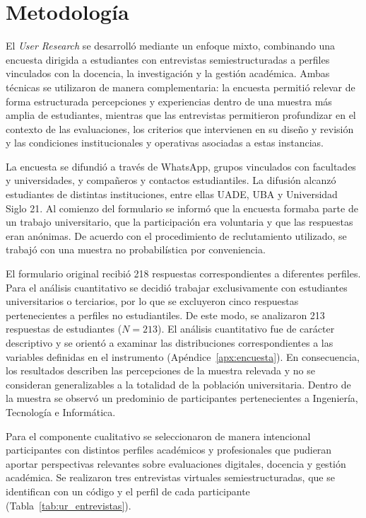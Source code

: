 \section{Metodología}

El \textit{User Research} se desarrolló mediante un enfoque mixto, combinando una encuesta dirigida a estudiantes con entrevistas semiestructuradas a perfiles vinculados con la docencia, la investigación y la gestión académica. Ambas técnicas se utilizaron de manera complementaria: la encuesta permitió relevar de forma estructurada percepciones y experiencias dentro de una muestra más amplia de estudiantes, mientras que las entrevistas permitieron profundizar en el contexto de las evaluaciones, los criterios que intervienen en su diseño y revisión y las condiciones institucionales y operativas asociadas a estas instancias.

La encuesta se difundió a través de WhatsApp, grupos vinculados con facultades y universidades, y compañeros y contactos estudiantiles. La difusión alcanzó estudiantes de distintas instituciones, entre ellas UADE, UBA y Universidad Siglo 21. Al comienzo del formulario se informó que la encuesta formaba parte de un trabajo universitario, que la participación era voluntaria y que las respuestas eran anónimas. De acuerdo con el procedimiento de reclutamiento utilizado, se trabajó con una muestra no probabilística por conveniencia.

El formulario original recibió 218 respuestas correspondientes a diferentes perfiles. Para el análisis cuantitativo se decidió trabajar exclusivamente con estudiantes universitarios o terciarios, por lo que se excluyeron cinco respuestas pertenecientes a perfiles no estudiantiles. De este modo, se analizaron 213 respuestas de estudiantes ($N=213$). El análisis cuantitativo fue de carácter descriptivo y se orientó a examinar las distribuciones correspondientes a las variables definidas en el instrumento (Apéndice~\ref{apx:encuesta}). En consecuencia, los resultados describen las percepciones de la muestra relevada y no se consideran generalizables a la totalidad de la población universitaria. Dentro de la muestra se observó un predominio de participantes pertenecientes a Ingeniería, Tecnología e Informática.

Para el componente cualitativo se seleccionaron de manera intencional participantes con distintos perfiles académicos y profesionales que pudieran aportar perspectivas relevantes sobre evaluaciones digitales, docencia y gestión académica. Se realizaron tres entrevistas virtuales semiestructuradas, que se identifican con un código y el perfil de cada participante (Tabla~\ref{tab:ur_entrevistas}).

